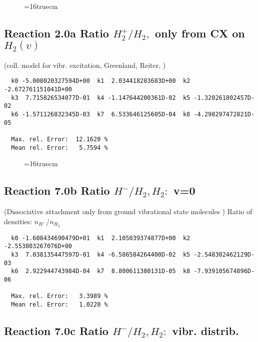 \documentclass[12pt]{article}
\begin{document}
\begin{figure} \label{2.18ll}
\epsfxsize=16truecm
\end{figure}
\newpage

\subsection{
Reaction 2.0a   Ratio $H_2^+/H_2,$ only from CX on $H_2(v)$
}
(coll. model for vibr. excitation, Greenland, Reiter, \cite{kn:Green})


\begin{small}\begin{verbatim}
  k0 -5.008020327594D+00  k1  2.034418283683D+00  k2 -2.672761151041D+00
  k3  7.715826534077D-01  k4 -1.147644200361D-02  k5 -1.320261802457D-02
  k6 -1.571126832345D-03  k7  6.533646125605D-04  k8 -4.298297472821D-05

  Max. rel. Error:  12.1620 %
  Mean rel. Error:   5.7594 %

\end{verbatim}\end{small}

\begin{figure} \label{2.0a}
\epsfxsize=16truecm
\end{figure}

\newpage
\subsection{
Reaction 7.0b      Ratio $H^-/H_2, H_2: $ v=0
}


  (Dissociative attachment only from ground vibrational state
 molecules \cite{kn:Green})
  Ratio of densities: $n_{H^-}/n_{H_2}$

\begin{small}\begin{verbatim}
  k0 -1.608434690479D+01  k1  2.105039374877D+00  k2 -2.553803267076D+00
  k3  7.038135447597D-01  k4 -6.586584264400D-02  k5 -2.548302462129D-03
  k6  2.922944743984D-04  k7  8.800611380131D-05  k8 -7.939105674896D-06

  Max. rel. Error:   3.3989 %
  Mean rel. Error:   1.0220 %
\end{verbatim}\end{small}

\subsection{
Reaction 7.0c      Ratio $H^-/H_2, H_2: $ vibr. distrib.
}
\end{document}
